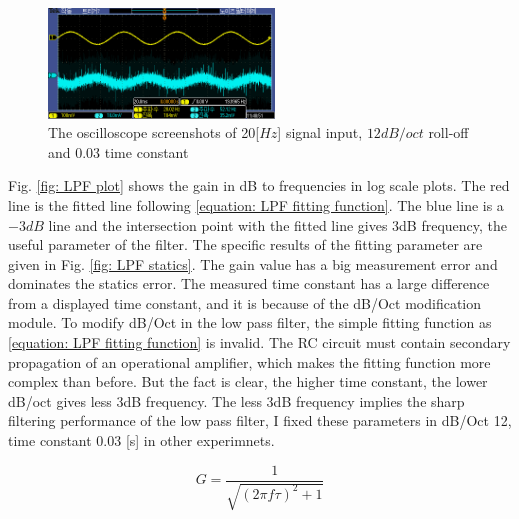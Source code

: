 \documentclass{article}
\begin{document}
 \begin{figure}[H]
  \centering
  \includegraphics[width = 6cm] {../raw_data/TEK00484.PNG}
  \caption{The oscilloscope screenshots of 20[$Hz$] signal input, $12 dB/oct$ roll-off and 0.03 time constant}
  \label{fig: raw_plot of LPF}
 \end{figure}

 Fig. \ref{fig: LPF plot} shows the gain in dB to frequencies in log scale plots.
 The red line is the fitted line following \ref{equation: LPF fitting function}.
 The blue line is a $-3dB$ line and the intersection point with the fitted line gives 3dB frequency, the useful parameter of the filter.
 The specific results of the fitting parameter are given in Fig. \ref{fig: LPF statics}.
 The gain value has a big measurement error and dominates the statics error.
 The measured time constant has a large difference from a displayed time constant, and it is because of the dB/Oct modification module.
 To modify dB/Oct in the low pass filter, the simple fitting function as \ref{equation: LPF fitting function} is invalid.
 The RC circuit must contain secondary propagation of an operational amplifier, which makes the fitting function more complex than before.
 But the fact is clear, the higher time constant, the lower dB/oct gives less 3dB frequency.
 The less 3dB frequency implies the sharp filtering performance of the low pass filter, I fixed these parameters in dB/Oct 12, time constant 0.03 [s] in other experimnets.

 \begin{equation}
  G = \frac{1}{\sqrt{(2 \pi f \tau)^2 +1}}
  \label{equation: LPF fitting function}
 \end{equation}
\end{document}
